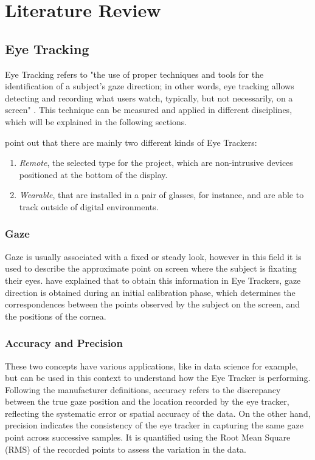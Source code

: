 \section{Literature Review} 

\subsection{Eye Tracking}

Eye Tracking refers to "the use of proper techniques and tools for the identification of a subject's gaze direction; in other words, eye tracking allows detecting and recording what users watch, typically, but not necessarily, on a screen" \citep{inproc:eyetracking-2014}. This technique can be measured and applied in different disciplines, which will be explained in the following sections.

\cite{art:gaze-hci-2023} point out that there are mainly two different kinds of Eye Trackers:
\begin{enumerate}
    \item \textit{Remote}, the selected type for the project, which are non-intrusive devices positioned at the bottom of the display.
    \item \textit{Wearable}, that are installed in a pair of glasses, for instance, and are able to track outside of digital environments.
\end{enumerate}

\subsubsection{Gaze}

Gaze is usually associated with a fixed or steady look, however in this field it is used to describe the approximate point on screen where the subject is fixating their eyes. \cite{inproc:eyetracking-2014} have explained that to obtain this information in Eye Trackers, gaze direction is obtained during an initial calibration phase, which determines the correspondences between the points observed by the subject on the screen, and the positions of the cornea. 

\subsubsection{Accuracy and Precision}

These two concepts have various applications, like in data science for example, but can be used in this context to understand how the Eye Tracker is performing. Following the manufacturer definitions, accuracy refers to the discrepancy between the true gaze position and the location recorded by the eye tracker, reflecting the systematic error or spatial accuracy of the data. On the other hand, precision indicates the consistency of the eye tracker in capturing the same gaze point across successive samples. It is quantified using the Root Mean Square (RMS) of the recorded points to assess the variation in the data. \citep{misc:acc-prec-tobii-2023}

